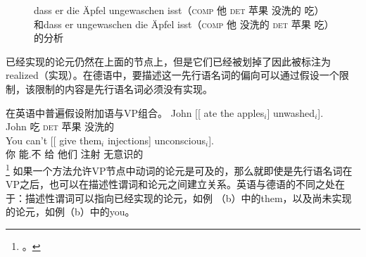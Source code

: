 \begin{figure}
\caption{dass er die Äpfel ungewaschen isst（\textsc{comp} 他 \textsc{det} 苹果 没洗的 吃）和dass er ungewaschen die Äpfel isst（\textsc{comp} 他 没洗的 \textsc{det} 苹果 吃）的分析}\label{anal-er-die-frau-nackt-sieht}
\end{figure}%
已经实现的论元仍然在上面的节点上，但是它们已经被划掉了因此被标注为realized（实现）。在德语中，要描述这一先行语名词的偏向可以通过假设一个限制，该限制的内容是先行语名词必须没有实现。

在英语中普遍假设附加语与VP组合。
\eal
\ex 
\gll John [[ ate the apples$_i$] unwashed$_i$].\\
	John {} 吃 \textsc{det} 苹果 没洗的\\
\ex 
\gll You can't [[ give them$_i$ injections] unconscious$_i$].\\
	你 能.不 {} 给 他们 注射 无意识的\\
\footnote{%
 。
}
\zl
如果一个方法允许VP节点中动词的论元是可及的，那么就即使是先行语名词在VP之后，也可以在描述性谓词和论元之间建立关系。英语与德语的不同之处在于：描述性谓词可以指向已经实现的论元，如例 （b）中的them，以及尚未实现的论元，如例（b）中的you。

